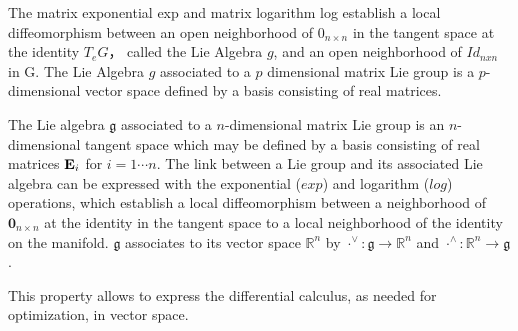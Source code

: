 \documentclass[a4paper]{report}
\begin{document}
The matrix exponential exp and matrix logarithm log establish a local diffeomorphism between an open neighborhood of $0_{n \times n}$ in the tangent space at the identity $T_eG$， called the Lie Algebra $g$, and an open neighborhood of $Id_{nxn}$ in G. The Lie Algebra $g$ associated to a $p$ dimensional matrix Lie group is a $p$-dimensional vector space defined by a basis consisting of real matrices.


The Lie algebra $\mathfrak{g}$ associated to a $n$-dimensional matrix Lie group is an $n$-dimensional tangent space which may be defined by a basis consisting of real matrices $\bold{E}_i$ for $i=1 \cdots n$. The link between a Lie group and its associated Lie algebra can be expressed with the exponential ($exp$) and logarithm ($log$) operations, which establish a local diffeomorphism between a neighborhood of $\bm{0}_{n \times n}$ at the identity in the tangent space to a local neighborhood of the identity on the manifold. $\mathfrak{g}$ associates to its vector space $\mathbb{R}^{n}$ by ${\cdot}^{\vee}: \mathfrak{g} \to \mathbb{R}^n$ and ${\cdot}^{\land}: \mathbb{R}^n \to \mathfrak{g}$.

This property allows to express the differential calculus, as needed for optimization, in vector space.
\end{document}
